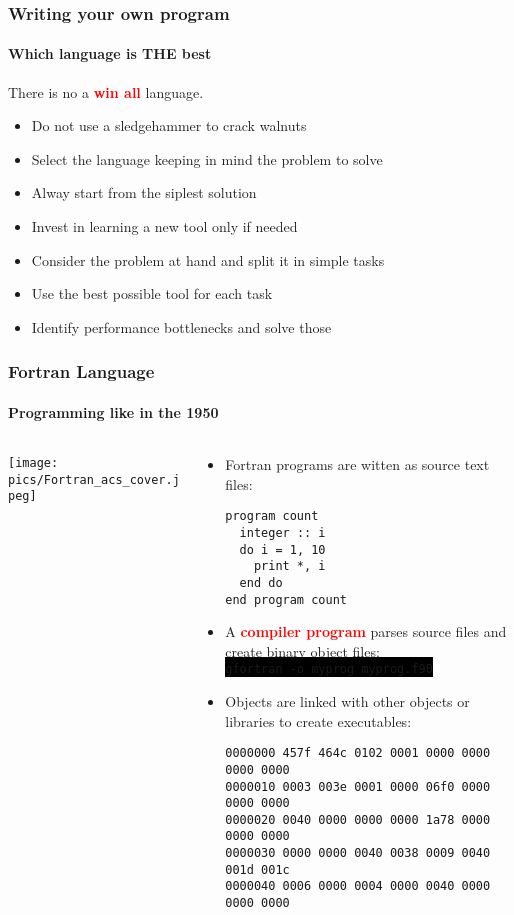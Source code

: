 \documentclass[unknownkeysallowed, 10pt, a4 paper, handout]{beamer}
\newcommand{\focus}[1]{\textbf{\textcolor{red}{#1}}}
\newcommand{\code}[1]{\colorbox{black}{\color{green}\texttt{#1}}}
\begin{document}
\begin{frame}[label=whichone]
  \frametitle{Writing your own program}
  \framesubtitle{Which language is THE best}
  There is no a \focus{win all} language.
  \begin{itemize}
    \item Do not use a sledgehammer to crack walnuts
    \item Select the language keeping in mind the problem to solve
    \item Alway start from the siplest solution
    \item Invest in learning a new tool only if needed
    \item Consider the problem at hand and split it in simple tasks
    \item Use the best possible tool for each task
    \item Identify performance bottlenecks and solve those
  \end{itemize}
\end{frame}


\begin{frame}[label=Fortran, fragile=singleslide]
  \frametitle{Fortran Language}
  \framesubtitle{Programming like in the 1950}
  \begin{columns}[T]
    \begin{column}{.23\textwidth}
      \vspace{30pt}
      \texttt{[image: pics/Fortran\_acs\_cover.jpeg]}
    \end{column}
    \hfill
    \begin{column}{.76\textwidth}
      \begin{itemize}
        \item Fortran programs are witten as source text files: \\
          \footnotesize{
            \begin{verbatim}
program count
  integer :: i
  do i = 1, 10
    print *, i
  end do
end program count
            \end{verbatim}
          }
        \item \normalsize{A \focus{compiler program} parses source files and
            create binary object files:} \\
          \footnotesize{
          \code{gfortran -o myprog myprog.f90}
          }
        \item \normalsize{Objects are linked with other objects or
           libraries to create executables:} \\
          \footnotesize{
            \begin{verbatim}
0000000 457f 464c 0102 0001 0000 0000 0000 0000
0000010 0003 003e 0001 0000 06f0 0000 0000 0000
0000020 0040 0000 0000 0000 1a78 0000 0000 0000
0000030 0000 0000 0040 0038 0009 0040 001d 001c
0000040 0006 0000 0004 0000 0040 0000 0000 0000
            \end{verbatim}
          }
      \end{itemize}
    \end{column}
  \end{columns}
\end{frame}
\end{document}
